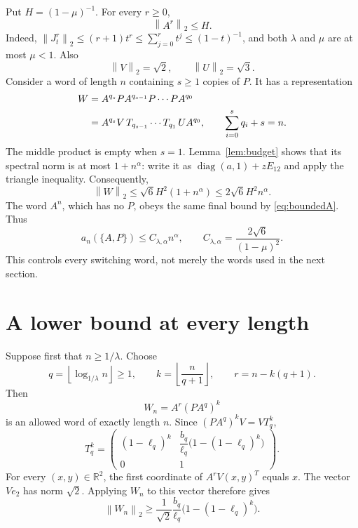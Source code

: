 \documentclass[11pt]{article}
\theoremstyle{remark}\newtheorem{remark}[theorem]{Remark}
\newcommand{\R}{\mathbb R}
\newcommand{\norm}[1]{\left\lVert #1\right\rVert_2}
\newcommand{\diag}{\operatorname{diag}}
\begin{document}
Put $H=(1-\mu)^{-1}$. For every $r\geq0$,
\begin{equation}\label{eq:boundedA}
 \norm{A^r}\leq H.
\end{equation}
Indeed, $\norm{J_t^r}\leq(r+1)t^r\leq\sum_{j=0}^rt^j\leq(1-t)^{-1}$, and both $\lambda$ and $\mu$ are at most $\mu<1$. Also
\[
 \norm{V}=\sqrt2,\qquad \norm{U}=\sqrt3.
\]
Consider a word of length $n$ containing $s\geq1$ copies of $P$. It has a representation
\begin{align}
 W&=A^{q_s}P A^{q_{s-1}}P\cdots P A^{q_0}\notag\\
  &=A^{q_s}V\, T_{q_{s-1}}\cdots T_{q_1}\,U A^{q_0},
 \qquad \sum_{i=0}^s q_i+s=n.\label{eq:factor}
\end{align}
The middle product is empty when $s=1$. Lemma~\ref{lem:budget} shows that its spectral norm is at most $1+n^\alpha$: write it as $\diag(a,1)+zE_{12}$ and apply the triangle inequality. Consequently,
\[
 \norm W\leq\sqrt6 H^2(1+n^\alpha)
             \leq2\sqrt6 H^2n^\alpha.
\]
The word $A^n$, which has no $P$, obeys the same final bound by \eqref{eq:boundedA}. Thus
\begin{equation}\label{eq:upper}
 a_n(\{A,P\})\leq C_{\lambda,\alpha}n^\alpha,
 \qquad C_{\lambda,\alpha}=\frac{2\sqrt6}{(1-\mu)^2}.
\end{equation}
This controls every switching word, not merely the words used in the next section.

\section{A lower bound at every length}
Suppose first that $n\geq1/\lambda$. Choose
\[
 q=\left\lfloor\log_{1/\lambda}n\right\rfloor\geq1,
 \qquad k=\left\lfloor\frac{n}{q+1}\right\rfloor,
 \qquad r=n-k(q+1).
\]
Then
\begin{equation}\label{eq:wordlower}
 W_n=A^r(PA^q)^k
\end{equation}
is an allowed word of exactly length $n$. Since $(PA^q)^kV=VT_q^k$,
\[
 T_q^k=\begin{pmatrix}
 (1-\ell_q)^k&\dfrac{b_q}{\ell_q}\bigl(1-(1-\ell_q)^k\bigr)\\[3pt]
 0&1
 \end{pmatrix}.
\]
For every $(x,y)\in\R^2$, the first coordinate of $A^rV(x,y)^T$ equals $x$. The vector $Ve_2$ has norm $\sqrt2$. Applying $W_n$ to this vector therefore gives
\begin{equation}\label{eq:lowerRayleigh}
 \norm{W_n}\geq\frac1{\sqrt2}\frac{b_q}{\ell_q}
                 \bigl(1-(1-\ell_q)^k\bigr).
\end{equation}
\end{document}
